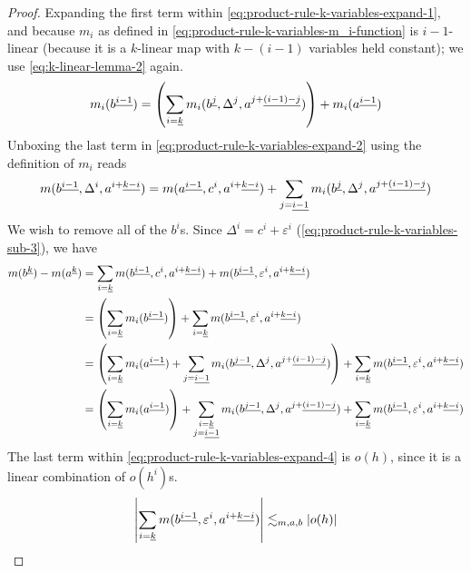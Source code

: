 \documentclass[../main-manifolds.tex]{subfiles}
\begin{document}
\begin{proof}
    Expanding the first term within \cref{eq:product-rule-k-variables-expand-1}, and because $m_i$ as defined in \cref{eq:product-rule-k-variables-m_i-function} is $i-1$-linear (because it is a $k$-linear map with $k-(i-1)$ variables held constant); we use \cref{eq:k-linear-lemma-2} again.
    \begin{equation}\label{eq:product-rule-k-variables-expand-2}
        m_i(\UPL{b}[i-1]) = \qty(\sum_{i=\underline{k}} m_i(\UPL{b}[j], \Delta^j, \UPL{a}[j+][(i-1)-j])) + m_i(\UPL{a}[i-1])
    \end{equation}
    Unboxing the last term in \cref{eq:product-rule-k-variables-expand-2} using the definition of $m_i$ reads
    \begin{equation}\label{eq:product-rule-k-variables-expand-3}
        m(\UPL{b}[i-1],\Delta^i,\UPL{a}[i+][k-i]) = m(\UPL{a}[i-1],c^i,\UPL{a}[i+][k-i]) + \sum_{j=\underline{i-1}}m_i(\UPL{b}[j],\Delta^j,\UPL{a}[j+][(i-1)-j])
    \end{equation}
    We wish to remove all of the $b^i$s. Since $\Delta^i = c^i + \varepsilon^i$ (\cref{eq:product-rule-k-variables-sub-3}), we have
    \begin{align}
        m(\UPL{b}[k]) - m(\UPL{a}[k]) &= \sum_{i=\underline{k}} m(\UPL{b}[i-1],c^i,\UPL{a}[i+][k-i]) + m(\UPL{b}[i-1],\varepsilon^i,\UPL{a}[i+][k-i])\nonumber\\
        &= \qty(\sum_{i=\underline{k}}m_i(\UPL{b}[i-1])) + \sum_{i=\underline{k}}m(\UPL{b}[i-1],\varepsilon^i,\UPL{a}[i+][k-i])\nonumber\\
        &= \qty(\sum_{i=\underline{k}} m_i(\UPL{a}[i-1]) + \sum_{j=\underline{i-1}}m_i(\UPL{b}[j-1],\Delta^{j},\UPL{a}[j+][(i-1)-j])) + \sum_{i=\underline{k}} m(\UPL{b}[i-1],\varepsilon^i,\UPL{a}[i+][k-i])\nonumber\\
        &= \qty(\sum_{i=\underline{k}}m_i(\UPL{a}[i-1]))  + \sum_{\substack{i=\underline{k}\\ j=\underline{i-1}}} m_i(\UPL{b}[j-1],\Delta^j,\UPL{a}[j+][(i-1)-j]) + \sum_{i=\underline{k}}m(\UPL{b}[i-1], \varepsilon^i,\UPL{a}[i+][k-i])\label{eq:product-rule-k-variables-expand-4}
    \end{align}
    The last term within \cref{eq:product-rule-k-variables-expand-4} is $o(h)$, since it is a linear combination of $o(h^i)$s. 
    \begin{equation}\label{eq:product-rule-k-variables-last-term-o(h)}
    \abs{\sum_{i=\underline{k}}m(\UPL{b}[i-1], \varepsilon^i,\UPL{a}[i+][k-i])}\Lsim_{m,a,b}\vert o(h)\vert
    \end{equation}

\end{proof}
\end{document}
